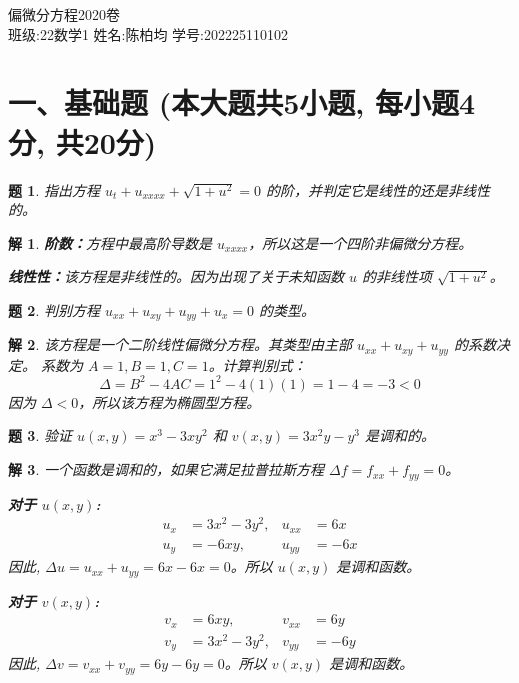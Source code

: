 \documentclass[12pt,a4paper]{article}
\newtheorem{problem}{题}
\newtheorem*{solution}{解}
\begin{document}
	
	\begin{center}
				\LARGE 偏微分方程2020卷 \\
		\vspace{0.5cm}
		\large 班级:22数学1 \quad 姓名:陈柏均 \quad 学号:202225110102
	\end{center}
	
	\section*{一、基础题 (本大题共5小题, 每小题4分, 共20分)}
	
	\begin{problem}
		指出方程 $u_t + u_{xxxx} + \sqrt{1+u^2} = 0$ 的阶，并判定它是线性的还是非线性的。
	\end{problem}
	\hrulefill
	\begin{solution}
		\textbf{阶数：}方程中最高阶导数是 $u_{xxxx}$，所以这是一个四阶非偏微分方程。
		
		\noindent
		\textbf{线性性：}该方程是非线性的。因为出现了关于未知函数 $u$ 的非线性项 $\sqrt{1+u^2}$。
	\end{solution}
	\hrulefill
	
	\begin{problem}
		判别方程 $u_{xx} + u_{xy} + u_{yy} + u_x = 0$ 的类型。
	\end{problem}
	\hrulefill
	\begin{solution}
		该方程是一个二阶线性偏微分方程。其类型由主部 $u_{xx} + u_{xy} + u_{yy}$ 的系数决定。
		系数为 $A=1, B=1, C=1$。计算判别式：
		\[
		\Delta = B^2 - 4AC = 1^2 - 4(1)(1) = 1 - 4 = -3 < 0
		\]
		因为 $\Delta < 0$，所以该方程为椭圆型方程。
	\end{solution}
	\hrulefill
	
	\begin{problem}
		验证 $u(x, y) = x^3 - 3xy^2$ 和 $v(x, y) = 3x^2y - y^3$ 是调和的。
	\end{problem}
	\hrulefill
	\begin{solution}
		一个函数是调和的，如果它满足拉普拉斯方程 $\Delta f = f_{xx} + f_{yy} = 0$。
		
		\noindent
		\textbf{对于 $u(x,y)$:}
		\begin{align*}
			u_x &= 3x^2 - 3y^2, & u_{xx} &= 6x \\
			u_y &= -6xy, & u_{yy} &= -6x
		\end{align*}
		因此, $\Delta u = u_{xx} + u_{yy} = 6x - 6x = 0$。所以 $u(x,y)$ 是调和函数。
		
		\noindent
		\textbf{对于 $v(x,y)$:}
		\begin{align*}
			v_x &= 6xy, & v_{xx} &= 6y \\
			v_y &= 3x^2 - 3y^2, & v_{yy} &= -6y
		\end{align*}
		因此, $\Delta v = v_{xx} + v_{yy} = 6y - 6y = 0$。所以 $v(x,y)$ 是调和函数。
	\end{solution}
	\hrulefill
	
\end{document}
